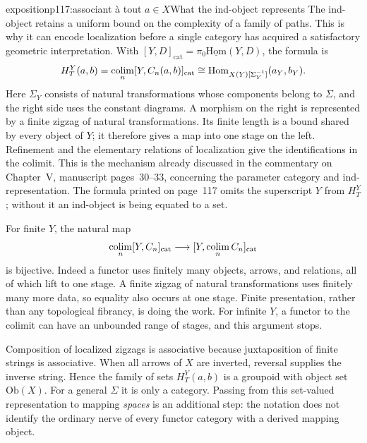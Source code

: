 \begin{dcomment}{exposition}{p117:associant à tout $a \in X$}{What the ind-object represents}
The ind-object retains a uniform bound on the complexity of a family of paths. This is why it can encode localization before a single category has acquired a satisfactory geometric interpretation. With $[Y,D]_{\mathrm{cat}}=\pi_0\underline{\mathrm{Hom}}(Y,D)$, the formula is
\[
 H_T^Y(a,b)=\mathop{\rm colim}_n[Y,C_n(a,b)]_{\mathrm{cat}}
 \cong\mathrm{Hom}_{X(Y)[\Sigma_Y^{-1}]}(a_Y,b_Y).
\]
Here $\Sigma_Y$ consists of natural transformations whose components belong to $\Sigma$, and the right side uses the constant diagrams. A morphism on the right is represented by a finite zigzag of natural transformations. Its finite length is a bound shared by every object of $Y$; it therefore gives a map into one stage on the left. Refinement and the elementary relations of localization give the identifications in the colimit. This is the mechanism already discussed in the commentary on Chapter~V, manuscript pages~30--33, concerning the parameter category and ind-representation. The formula printed on page~117 omits the superscript $Y$ from $H_T^Y$; without it an ind-object is being equated to a set.

For finite $Y$, the natural map
\[
 \mathop{\rm colim}_n[Y,C_n]_{\mathrm{cat}}
       \longrightarrow [Y,\mathop{\rm colim}_n C_n]_{\mathrm{cat}}
\]
is bijective. Indeed a functor uses finitely many objects, arrows, and relations, all of which lift to one stage. A finite zigzag of natural transformations uses finitely many more data, so equality also occurs at one stage. Finite presentation, rather than any topological fibrancy, is doing the work. For infinite $Y$, a functor to the colimit can have an unbounded range of stages, and this argument stops.

Composition of localized zigzags is associative because juxtaposition of finite strings is associative. When all arrows of $X$ are inverted, reversal supplies the inverse string. Hence the family of sets $H_T^Y(a,b)$ is a groupoid with object set $\mathrm{Ob}(X)$. For a general $\Sigma$ it is only a category. Passing from this set-valued representation to mapping \emph{spaces} is an additional step: the notation does not identify the ordinary nerve of every functor category with a derived mapping object.
\end{dcomment}

